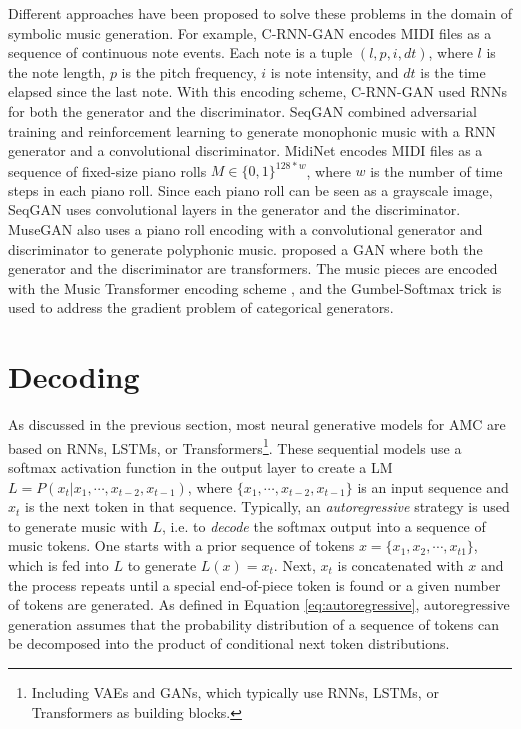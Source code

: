 Different approaches have been proposed to solve these problems in the domain of symbolic music generation. For example, C-RNN-GAN \cite{mogren2016c} encodes MIDI files as a sequence of continuous note events. Each note is a tuple $(l, p, i, dt)$, where $l$ is the note length, $p$ is the pitch frequency, $i$ is note intensity, and $dt$ is the time elapsed since the last note. With this encoding scheme, C-RNN-GAN used RNNs for both the generator and the discriminator. SeqGAN \cite{yu2017seqgan} combined adversarial training and reinforcement learning to generate monophonic music with a RNN generator and a convolutional discriminator. MidiNet \cite{yang2017midinet} encodes MIDI files as a sequence of fixed-size piano rolls $M \in \{0, 1\}^{128*w}$, where $w$ is the number of time steps in each piano roll. Since each piano roll can be seen as a grayscale image, SeqGAN uses convolutional layers in the generator and the discriminator. MuseGAN \cite{dong2018musegan} also uses a piano roll encoding with a convolutional generator and discriminator to generate polyphonic music. \citet{muhamed2021symbolic} proposed a GAN where both the generator and the discriminator are transformers. The music pieces are encoded with the Music Transformer encoding scheme \cite{huang2018music}, and the Gumbel-Softmax trick \cite{jang2016categorical} is used to address the gradient problem of categorical generators.

\section{Decoding}

As discussed in the previous section, most neural generative models for AMC are based on RNNs, LSTMs, or Transformers\footnote{Including VAEs and GANs, which typically use RNNs, LSTMs, or Transformers as building blocks.}. These sequential models use a softmax activation function in the output layer to create a LM $L = P(x_t|x_1, \cdots, x_{t-2}, x_{t-1})$, where $\{x_1, \cdots, x_{t-2}, x_{t-1}\}$ is an input sequence and $x_t$ is the next token in that sequence. Typically, an \textit{autoregressive} strategy is used to generate music with $L$, i.e. to \textit{decode} the softmax output into a sequence of music tokens. One starts with a prior sequence of tokens $x = \{x_1, x_2, \cdots, x_{t 1}\}$, which is fed into $L$ to generate $L(x) = x_{t}$. Next, $x_{t}$ is concatenated with $x$ and the process repeats until a special end-of-piece token is found or a given number of tokens are generated. As defined in Equation \ref{eq:autoregressive}, autoregressive generation assumes that the probability distribution of a sequence of tokens can be decomposed into the product of conditional next token distributions.

